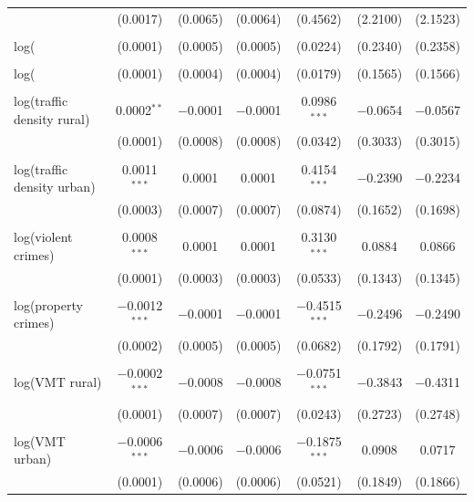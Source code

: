 \begin{table}[!htbp]
\begin{tabular}{@{\extracolsep{5pt}}lcccccc}
  & (0.0017) & (0.0065) & (0.0064) & (0.4562) & (2.2100) & (2.1523) \\ 
  & & & & & & \\ 
 log(%
  & (0.0001) & (0.0005) & (0.0005) & (0.0224) & (0.2340) & (0.2358) \\ 
  & & & & & & \\ 
 log(%
  & (0.0001) & (0.0004) & (0.0004) & (0.0179) & (0.1565) & (0.1566) \\ 
  & & & & & & \\ 
 log(traffic density rural) & 0.0002$^{**}$ & $-$0.0001 & $-$0.0001 & 0.0986$^{***}$ & $-$0.0654 & $-$0.0567 \\ 
  & (0.0001) & (0.0008) & (0.0008) & (0.0342) & (0.3033) & (0.3015) \\ 
  & & & & & & \\ 
 log(traffic density urban) & 0.0011$^{***}$ & 0.0001 & 0.0001 & 0.4154$^{***}$ & $-$0.2390 & $-$0.2234 \\ 
  & (0.0003) & (0.0007) & (0.0007) & (0.0874) & (0.1652) & (0.1698) \\ 
  & & & & & & \\ 
 log(violent crimes) & 0.0008$^{***}$ & 0.0001 & 0.0001 & 0.3130$^{***}$ & 0.0884 & 0.0866 \\ 
  & (0.0001) & (0.0003) & (0.0003) & (0.0533) & (0.1343) & (0.1345) \\ 
  & & & & & & \\ 
 log(property crimes) & $-$0.0012$^{***}$ & $-$0.0001 & $-$0.0001 & $-$0.4515$^{***}$ & $-$0.2496 & $-$0.2490 \\ 
  & (0.0002) & (0.0005) & (0.0005) & (0.0682) & (0.1792) & (0.1791) \\ 
  & & & & & & \\ 
 log(VMT rural) & $-$0.0002$^{***}$ & $-$0.0008 & $-$0.0008 & $-$0.0751$^{***}$ & $-$0.3843 & $-$0.4311 \\ 
  & (0.0001) & (0.0007) & (0.0007) & (0.0243) & (0.2723) & (0.2748) \\ 
  & & & & & & \\ 
 log(VMT urban) & $-$0.0006$^{***}$ & $-$0.0006 & $-$0.0006 & $-$0.1875$^{***}$ & 0.0908 & 0.0717 \\ 
  & (0.0001) & (0.0006) & (0.0006) & (0.0521) & (0.1849) & (0.1866) \\ 

\end{tabular}
\end{table}
